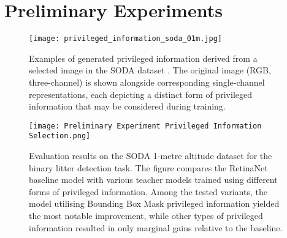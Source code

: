\graphicspath{{content/appendices/figures/}}

\chapter{Preliminary Experiments}

\vfill
\begin{figure}[!htbp]
    \centering%
    \texttt{[image: privileged\_information\_soda\_01m.jpg]}
    \caption{Examples of generated privileged information derived from a selected image in the SODA dataset \cite{soda_dataset}. The original image (RGB, three-channel) is shown alongside corresponding single-channel representations, each depicting a distinct form of privileged information that may be considered during training.}
    \label{fig:channels}
\end{figure}
\vfill
\vfill
\begin{figure}[!htbp]
    \centering
    \texttt{[image: Preliminary Experiment Privileged Information Selection.png]}
    \caption{Evaluation results on the SODA 1-metre altitude dataset for the binary litter detection task. The figure compares the RetinaNet baseline model with various teacher models trained using different forms of privileged information. Among the tested variants, the model utilising Bounding Box Mask privileged information yielded the most notable improvement, while other types of privileged information resulted in only marginal gains relative to the baseline.}
    \label{fig:preliminary_privileged}
\end{figure}
\vfill